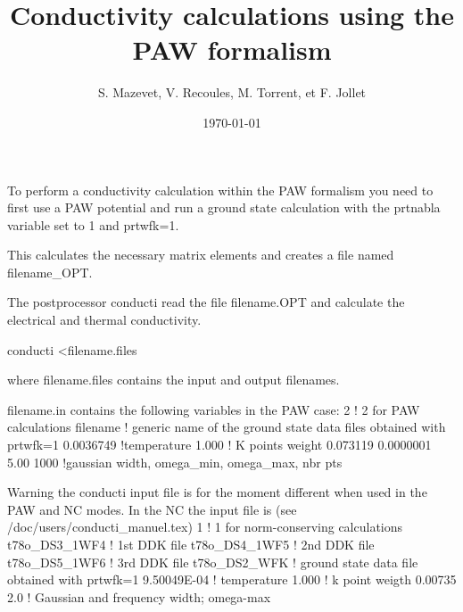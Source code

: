 \documentclass[aps,prl,twocolumn,superscriptaddress]{revtex4}
\begin{document}
%
    \title{Conductivity calculations using the PAW formalism }


   \author{S. Mazevet, V. Recoules, M. Torrent, et F. Jollet}


   \date{\today}

To perform a conductivity calculation within the PAW formalism you need to first use 
a PAW potential and run a ground state calculation with the prtnabla variable set to 1 and prtwfk=1.

This calculates the necessary matrix elements and creates a file named filename\_OPT.

The postprocessor conducti read the file filename.OPT and calculate the electrical and thermal conductivity.

conducti <filename.files

where filename.files contains the input and output filenames.

filename.in contains the following variables in the PAW case:
2                 ! 2 for PAW calculations
filename     ! generic name of the ground state data files obtained with   prtwfk=1
0.0036749         !temperature 
1.000             ! K points weight
0.073119 0.0000001 5.00 1000   !gaussian width, omega\_min, omega\_max, nbr pts

Warning the conducti input file is for the moment different when used in the 
PAW and NC modes. In the NC the input file is (see /doc/users/conducti\_manuel.tex)
1                 ! 1 for norm-conserving calculations
t78o\_DS3\_1WF4 ! 1st DDK file
t78o\_DS4\_1WF5 ! 2nd DDK file
t78o\_DS5\_1WF6 ! 3rd DDK file
t78o\_DS2\_WFK  ! ground state data file obtained with   prtwfk=1
9.50049E-04   ! temperature
1.000         ! k point weigth
0.00735  2.0  ! Gaussian and frequency width; omega-max
\end{document}

